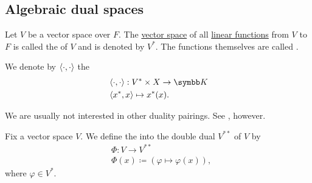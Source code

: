 \subsection{Algebraic dual spaces}\label{subsec:algebraic_dual_spaces}

\begin{Definition}\label{def:dual_vector_space}
  Let \( V \) be a vector space over \( F \). The \hyperref[thm:functions_over_ring_form_algebra]{vector space} of all \hyperref[def:linear_operator]{linear functions} from \( V \) to \( F \) is called the  of \( V \) and is denoted by \( V^* \). The functions themselves are called .
\end{Definition}

\begin{Definition}\label{def:canonical_duality_pairing}
  We denote by \( \left\langle \cdot, \cdot \right\rangle \) the 
  \begin{align*}
    &\Prod \cdot \cdot: V^* \times X \to \BK \\
    &\Prod {x^*} x \mapsto x^*(x).
  \end{align*}

  We are usually not interested in other duality pairings. See , however.
\end{Definition}

\begin{Definition}\label{def:double_dual_canonical_embedding}
  Fix a vector space \( V \). We define the  into the double dual \( V^{**} \) of \( V \) by
  \begin{align*}
    &\Phi: V \to V^{**} \\
    &\Phi(x) \coloneqq (\varphi \mapsto \varphi(x)),
  \end{align*}
  where \( \varphi \in V^* \).
\end{Definition}

